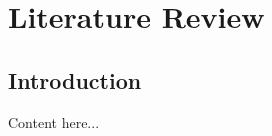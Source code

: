 \documentclass[proposal]{subfiles}
\begin{document}
\chapter{Literature Review}

\section{Introduction}
Content here...
\end{document}
